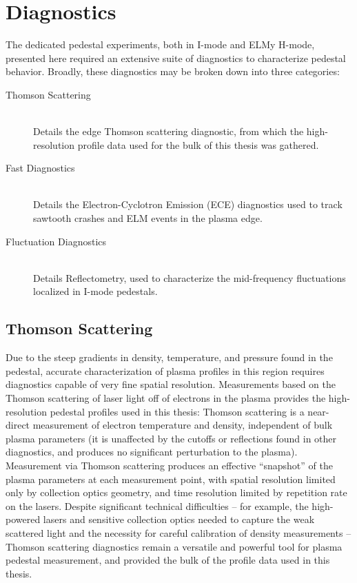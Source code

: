 \chapter{Diagnostics}\label{app:Diagnostics}

The dedicated pedestal experiments, both in I-mode and ELMy H-mode, presented here required an extensive suite of diagnostics to characterize pedestal behavior.  Broadly, these diagnostics may be broken down into three categories:

\begin{description}
 \item[Thomson Scattering] \hfill \\
 Details the edge Thomson scattering diagnostic, from which the high-resolution profile data used for the bulk of this thesis was gathered.
 \item[Fast Diagnostics] \hfill \\
 Details the Electron-Cyclotron Emission (ECE) diagnostics used to track sawtooth crashes and ELM events in the plasma edge.
 \item[Fluctuation Diagnostics] \hfill \\
 Details Reflectometry, used to characterize the mid-frequency fluctuations localized in I-mode pedestals.\nicesectionending
\end{description}

\section{Thomson Scattering}\label{sec:app_ts}

Due to the steep gradients in density, temperature, and pressure found in the pedestal, accurate characterization of plasma profiles in this region requires diagnostics capable of very fine spatial resolution.  Measurements based on the Thomson scattering \cite{Sheffield} of laser light off of electrons in the plasma provides the high-resolution pedestal profiles used in this thesis: Thomson scattering is a near-direct measurement of electron temperature and density, independent of bulk plasma parameters (\ie it is unaffected by the cutoffs or reflections found in other diagnostics, and produces no significant perturbation to the plasma).  Measurement via Thomson scattering produces an effective ``snapshot'' of the plasma parameters at each measurement point, with spatial resolution limited only by collection optics geometry, and time resolution limited by repetition rate on the lasers.  Despite significant technical difficulties -- for example, the high-powered lasers and sensitive collection optics needed to capture the weak scattered light and the necessity for careful calibration of density measurements -- Thomson scattering diagnostics remain a versatile and powerful tool for plasma pedestal measurement, and provided the bulk of the profile data used in this thesis.

